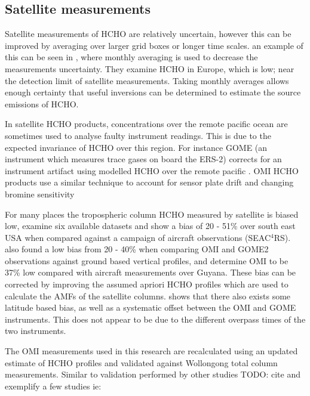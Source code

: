   \subsection{Satellite measurements}
    Satellite measurements of HCHO are relatively uncertain, however this can be improved by averaging over larger grid boxes or longer time scales.
    an example of this can be seen in \citet{Dufour2009}, where monthly averaging is used to decrease the measurements uncertainty.
    They examine HCHO in Europe, which is low; near the detection limit of satellite measurements.
    Taking monthly averages allows enough certainty that useful inversions can be determined to estimate the source emissions of HCHO.
    
    In satellite HCHO products, concentrations over the remote pacific ocean are sometimes used to analyse faulty instrument readings.
    This is due to the expected invariance of HCHO over this region.
    For instance GOME (an instrument which measures trace gases on board the ERS-2) corrects for an instrument artifact using modelled HCHO over the remote pacific \citep{Shim2015}.
    OMI HCHO products use a similar technique to account for sensor plate drift and changing bromine sensitivity \citep{Abad2015}
    
    For many places the tropospheric column HCHO measured by satellite is biased low, \citet{Zhu2016} examine six available datasets and show a bias of 20 - 51\% over south east USA when compared against a campaign of aircraft observations (SEAC$^4$RS).
    \citet{DeSmedt2015} also found a low bias from 20 - 40\% when comparing OMI and GOME2 observations against ground based vertical profiles, and \citet{Barkley2013} determine OMI to be 37\% low compared with aircraft measurements over Guyana.
    These bias can be corrected by improving the assumed apriori HCHO profiles which are used to calculate the AMFs of the satellite columns.
    \cite{Millet2008} shows that there also exists some latitude based bias, as well as a systematic offset between the OMI and GOME instruments.
    This does not appear to be due to the different overpass times of the two instruments.
    
    The OMI measurements used in this research are recalculated using an updated estimate of HCHO profiles and validated against Wollongong total column measurements. 
    Similar to validation performed by other studies TODO: cite and exemplify a few studies ie: \citet{Zhu2016, Marais2014, Palmer2003} 
    
